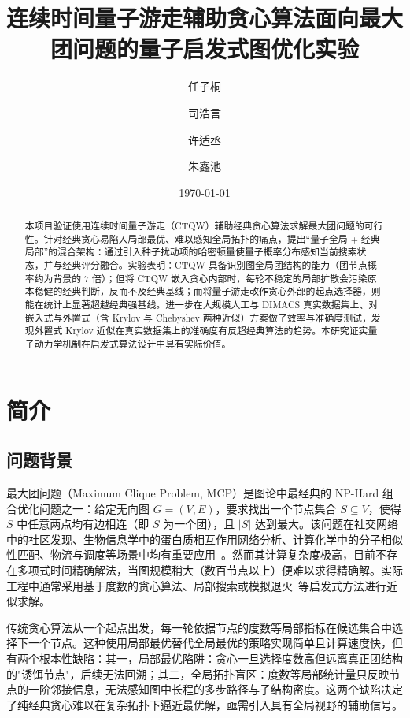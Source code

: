 \documentclass[pre,twocolumn]{revtex4-2}
\begin{document}
\title{连续时间量子游走辅助贪心算法面向最大团问题的量子启发式图优化实验}

\author{任子桐}
\author{司浩言}
\author{许适丞}
\author{朱鑫池}

\date{\today}

\begin{abstract}
本项目验证使用连续时间量子游走（CTQW）辅助经典贪心算法求解最大团问题的可行性。针对经典贪心易陷入局部最优、难以感知全局拓扑的痛点，提出“量子全局 + 经典局部”的混合架构：通过引入种子扰动项的哈密顿量使量子概率分布感知当前搜索状态，并与经典评分融合。实验表明：CTQW 具备识别图全局团结构的能力（团节点概率约为背景的 $7$ 倍）；但将 CTQW 嵌入贪心内部时，每轮不稳定的局部扩散会污染原本稳健的经典判断，反而不及经典基线；而将量子游走改作贪心外部的起点选择器，则能在统计上显著超越经典强基线。进一步在大规模人工与 DIMACS 真实数据集上、对嵌入式与外置式（含 Krylov 与 Chebyshev 两种近似）方案做了效率与准确度测试，发现外置式 Krylov 近似在真实数据集上的准确度有反超经典算法的趋势。本研究证实量子动力学机制在启发式算法设计中具有实际价值。
\end{abstract}

\maketitle

\section{简介}

\subsection{问题背景}
最大团问题（Maximum Clique Problem, MCP）是图论中最经典的 NP-Hard 组合优化问题之一：给定无向图 $G=(V,E)$，要求找出一个节点集合 $S\subseteq V$，使得 $S$ 中任意两点均有边相连（即 $S$ 为一个团），且 $|S|$ 达到最大。该问题在社交网络中的社区发现、生物信息学中的蛋白质相互作用网络分析、计算化学中的分子相似性匹配、物流与调度等场景中均有重要应用~\cite{pardalos1994}。然而其计算复杂度极高，目前不存在多项式时间精确解法，当图规模稍大（数百节点以上）便难以求得精确解。实际工程中通常采用基于度数的贪心算法、局部搜索或模拟退火~\cite{kirkpatrick1983}等启发式方法进行近似求解。

传统贪心算法从一个起点出发，每一轮依据节点的度数等局部指标在候选集合中选择下一个节点。这种使用局部最优替代全局最优的策略实现简单且计算速度快，但有两个根本性缺陷：其一，局部最优陷阱：贪心一旦选择度数高但远离真正团结构的"诱饵节点"，后续无法回溯；其二，全局拓扑盲区：度数等局部统计量只反映节点的一阶邻接信息，无法感知图中长程的多步路径与子结构密度。这两个缺陷决定了纯经典贪心难以在复杂拓扑下逼近最优解，亟需引入具有全局视野的辅助信号。
\end{document}
